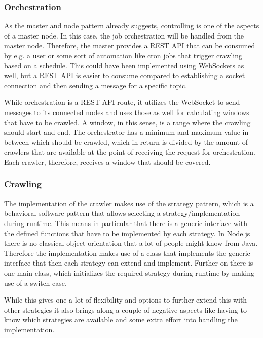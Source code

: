 \subsubsection{Orchestration}
As the master and node pattern already suggests, controlling is one of the aspects of a master node. In this case, the job orchestration will be handled from the master node. Therefore, the master provides a REST API that can be consumed by e.g. a user or some sort of automation like cron jobs that trigger crawling based on a schedule. This could have been implemented using WebSockets as well, but a REST API is easier to consume compared to establishing a socket connection and then sending a message for a specific topic.

While orchestration is a REST API route, it utilizes the WebSocket to send messages to its connected nodes and uses those as well for calculating windows that have to be crawled. A window, in this sense, is a range where the crawling should start and end. The orchestrator has a minimum and maximum value in between which should be crawled, which in return is divided by the amount of crawlers that are available at the point of receiving the request for orchestration. Each crawler, therefore, receives a window that should be covered.

\subsubsection{Crawling}
The implementation of the crawler makes use of the strategy pattern, which is a behavioral software pattern that allows selecting a strategy/implementation during runtime. This means in particular that there is a generic interface with the defined functions that have to be implemented by each strategy. In Node.js there is no classical object orientation that a lot of people might know from Java. Therefore the implementation makes use of a class that implements the generic interface that then each strategy can extend and implement. Further on there is one main class, which initializes the required strategy during runtime by making use of a switch case.

While this gives one a lot of flexibility and options to further extend this with other strategies it also brings along a couple of negative aspects like having to know which strategies are available and some extra effort into handling the implementation.

